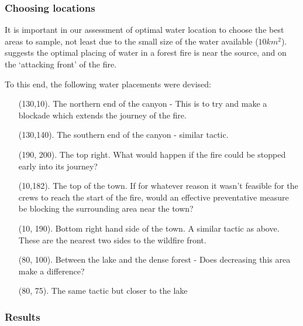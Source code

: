 \documentclass[11pt, a4paper, titlepage]{article}
\begin{document}
  \subsubsection{Choosing locations}
  It is important in our assessment of optimal water location to choose the best areas to sample, not least due to the small size of the water available ($10km^2$). \cite{christopher_2019} suggests the optimal placing of water in a forest fire is near the source, and on the `attacking front' of the fire.

  To this end, the following water placements were devised:

  \begin{itemize}
    \item[(130,10).] The northern end of the canyon - This is to try and make a blockade which extends the journey of the fire.
    \item[(130,140).] The southern end of the canyon - similar tactic.
    \item[(190, 200).]  The top right. What would happen if the fire could be stopped early into its journey?
    \item[ (10,182).] The top of the town. If for whatever reason it wasn't feasible for the crews to reach the start of the fire, would an effective preventative measure be blocking the surrounding area near the town?
    \item[ (10, 190).] Bottom right hand side of the town. A similar tactic as above. These are the nearest two sides to the wildfire front.
    \item[ (80, 100).] Between the lake and the dense forest - Does decreasing this area make a difference?
    \item[ (80, 75).] The same tactic but closer to the lake    
  \end{itemize}

  \subsubsection{Results}

  
\end{document}
